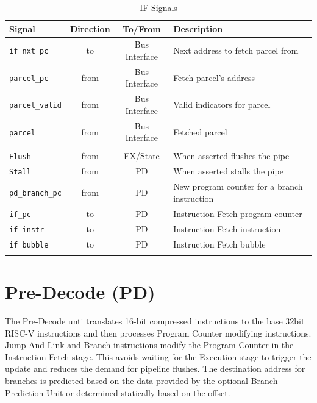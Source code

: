 \begin{longtable}[]{@{}lccl@{}}
	\toprule
	\textbf{Signal} & \textbf{Direction} & \textbf{To/From} & \textbf{Description}\tabularnewline
	\midrule

	\endhead


	\texttt{if\_nxt\_pc}    & to   & Bus Interface & Next address to fetch parcel from\\
	\texttt{parcel\_pc}     & from & Bus Interface & Fetch parcel's address\\
	\texttt{parcel\_valid}  & from & Bus Interface & Valid indicators for parcel\\
	\texttt{parcel}         & from & Bus Interface & Fetched parcel\\
	& & &\\
	\texttt{Flush}          & from & EX/State      & When asserted flushes the pipe\\
	\texttt{Stall}          & from & PD            & When asserted stalls the pipe\\
	\texttt{pd\_branch\_pc} & from & PD            & New program counter for a branch instruction\\
	\texttt{if\_pc}         & to   & PD            & Instruction Fetch program counter\\
	\texttt{if\_instr}      & to   & PD            & Instruction Fetch instruction\\
	\texttt{if\_bubble}     & to   & PD            & Instruction Fetch bubble\\
		
	\bottomrule
\caption{IF Signals}
\label{tab:if-signals}
\end{longtable}

\pagebreak

\section{Pre-Decode (PD)}\label{pre-decode-pd}

The Pre-Decode unti translates 16-bit compressed instructions to the base 32bit RISC-V instructions and then processes Program Counter modifying instructions. 
Jump-And-Link and Branch instructions modify the Program Counter in the Instruction Fetch stage. 
This avoids waiting for the Execution stage to trigger the update and reduces the demand for pipeline flushes.
The destination address for branches is predicted based on the data provided by the optional Branch Prediction Unit or determined statically based on the offset.


